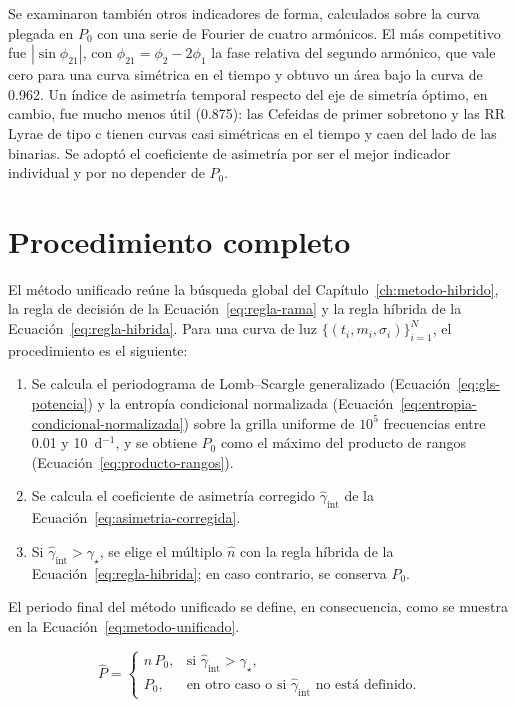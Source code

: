 \documentclass[12pt,letterpaper,oneside]{book}
\begin{document}
Se examinaron tambi\'en otros indicadores de forma, calculados sobre la curva plegada en $P_0$ con una serie de Fourier de cuatro arm\'onicos. El m\'as competitivo fue $|\sin\phi_{21}|$, con $\phi_{21}=\phi_2-2\phi_1$ la fase relativa del segundo arm\'onico, que vale cero para una curva sim\'etrica en el tiempo y obtuvo un \'area bajo la curva de 0.962. Un \'indice de asimetr\'ia temporal respecto del eje de simetr\'ia \'optimo, en cambio, fue mucho menos \'util (0.875): las Cefeidas de primer sobretono y las RR Lyrae de tipo c tienen curvas casi sim\'etricas en el tiempo y caen del lado de las binarias. Se adopt\'o el coeficiente de asimetr\'ia por ser el mejor indicador individual y por no depender de $P_0$.

\section{Procedimiento completo}
\label{sec:unificado-procedimiento}

El m\'etodo unificado re\'une la b\'usqueda global del Cap\'itulo~\ref{ch:metodo-hibrido}, la regla de decisi\'on de la Ecuaci\'on~\eqref{eq:regla-rama} y la regla h\'ibrida de la Ecuaci\'on~\eqref{eq:regla-hibrida}. Para una curva de luz $\{(t_i, m_i, \sigma_i)\}_{i=1}^{N}$, el procedimiento es el siguiente:

\begin{enumerate}
	\item Se calcula el periodograma de Lomb--Scargle generalizado (Ecuaci\'on~\ref{eq:gls-potencia}) y la entrop\'ia condicional normalizada (Ecuaci\'on~\ref{eq:entropia-condicional-normalizada}) sobre la grilla uniforme de $10^5$ frecuencias entre 0.01 y 10~d$^{-1}$, y se obtiene $P_0$ como el m\'aximo del producto de rangos (Ecuaci\'on~\ref{eq:producto-rangos}).
	\item Se calcula el coeficiente de asimetr\'ia corregido $\hat\gamma_{\mathrm{int}}$ de la Ecuaci\'on~\eqref{eq:asimetria-corregida}.
	\item Si $\hat\gamma_{\mathrm{int}}>\gamma_\star$, se elige el m\'ultiplo $\hat n$ con la regla h\'ibrida de la Ecuaci\'on~\eqref{eq:regla-hibrida}; en caso contrario, se conserva $P_0$.
\end{enumerate}

El periodo final del m\'etodo unificado se define, en consecuencia, como se muestra en la Ecuaci\'on~\eqref{eq:metodo-unificado}.

\begin{equation}
	\hat P =
	\begin{cases}
		\hat n\,P_0, & \text{si } \hat\gamma_{\mathrm{int}} > \gamma_\star, \\
		P_0, & \text{en otro caso o si } \hat\gamma_{\mathrm{int}} \text{ no est\'a definido}.
	\end{cases}
	\label{eq:metodo-unificado}
\end{equation}
\end{document}
